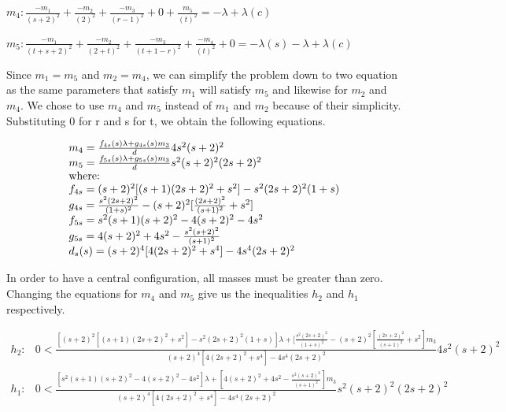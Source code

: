 \documentclass[11pt,leqno]{article}
\theoremstyle{definition}
\theoremstyle{remark}
\numberwithin{equation}{section}
\begin{document}
$m_{4}: \frac{-m_1}{(s+2)^2} + \frac{-m_2}{(2)^2} +\frac{-m_3}{(r-1)^2} + 0 + \frac{m_5}{(t)^2} =-\lambda+\lambda(c)$

$m_{5}: \frac{-m_1}{(t+s+2)^2} + \frac{-m_2}{(2+t)^2} +\frac{-m_3}{(t+1-r)^2} + \frac{-m_4}{(t)^2} + 0 =-\lambda(s)-\lambda+\lambda(c)$



\hspace{6cm}


\newline Since $m_1=m_5$ and $m_2=m_4$, we can simplify the problem down to two equation as the same parameters that satisfy $m_1$ will satisfy $m_5$ and likewise for $m_2$ and $m_4$. We chose to use $m_4$ and $m_5$ instead of $m_1$ and $m_2$ because of their simplicity. Substituting 0 for r and s for t, we obtain the following equations.



\begin{equation} \begin{array}{l}
m_{4}=\frac{f_{4s}(s)\lambda+g_{4s}(s)m_{3}}{d}4s^{2}(s+2)^{2} \\
m_{5}=\frac{f_{5s}(s)\lambda+g_{5s}(s)m_{3}}{d}s^{2}(s+2)^{2}(2s+2)^{2} \\
$where:$\\
f_{4s}=(s+2)^{2}[(s+1)(2s+2)^{2}+s^{2}]-s^{2}(2s+2)^{2}(1+s) \\
g_{4s}=\frac{s^{2}(2s+2)^{2}}{(1+s)^{2}}-(s+2)^{2}[\frac{(2s+2)^{2}}{(s+1)^{2}}+s^{2}] \\
f_{5s}=s^{2}(s+1)(s+2)^{2}-4(s+2)^{2}-4s^{2} \\
g_{5s}=4(s+2)^{2}+4s^{2}-\frac{s^{2}(s+2)^{2}}{(s+1)^{2}} \\
d_s(s)=(s+2)^{4}[4(2s+2)^{2}+s^{4}]-4s^{4}(2s+2)^{2}
\end{array}
\end{equation}

In order to have a central configuration, all masses must be greater than zero. Changing the equations for $m_4$ and $m_5$ give us the inequalities $h_2$ and $h_1$ respectively.  

\begin{equation} \begin{array}{ll}
h_2: & 0<\frac{[(s+2)^{2}[(s+1)(2s+2)^{2}+s^{2}]-s^{2}(2s+2)^{2}(1+s)]\lambda+[\frac{s^{2}(2s+2)^{2}}{(1+s)^{2}}-(s+2)^{2}[\frac{(2s+2)^{2}}{(s+1)^{2}}+s^{2}]m_{3}}{(s+2)^{4}[4(2s+2)^{2}+s^{4}]-4s^{4}(2s+2)^{2}}4s^{2}(s+2)^{2}\\

h_1: & 0<\frac{[s^{2}(s+1)(s+2)^{2}-4(s+2)^{2}-4s^{2}]\lambda+[4(s+2)^{2}+4s^{2}-\frac{s^{2}(s+2)^{2}}{(s+1)^{2}}]m_{3}}{(s+2)^{4}[4(2s+2)^{2}+s^{4}]-4s^{4}(2s+2)^{2}}s^{2}(s+2)^{2}(2s+2)^{2}
\end{array}
\end{equation}
\end{document}

